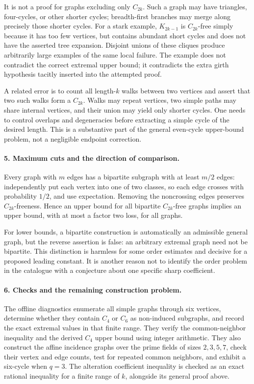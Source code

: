 \documentclass[11pt]{article}
\begin{document}
It is not a proof for graphs excluding only $C_{2k}$. Such a graph may have triangles, four-cycles, or other shorter cycles; breadth-first branches may merge along precisely those shorter cycles. For a stark example, $K_{2k-1}$ is $C_{2k}$-free simply because it has too few vertices, but contains abundant short cycles and does not have the asserted tree expansion. Disjoint unions of these cliques produce arbitrarily large examples of the same local failure. The example does not contradict the correct extremal upper bound; it contradicts the extra girth hypothesis tacitly inserted into the attempted proof.

A related error is to count all length-$k$ walks between two vertices and assert that two such walks form a $C_{2k}$. Walks may repeat vertices, two simple paths may share internal vertices, and their union may yield only shorter cycles. One needs to control overlaps and degeneracies before extracting a simple cycle of the desired length. This is a substantive part of the general even-cycle upper-bound problem, not a negligible endpoint correction.

\paragraph{5. Maximum cuts and the direction of comparison.}
Every graph with $m$ edges has a bipartite subgraph with at least $m/2$ edges: independently put each vertex into one of two classes, so each edge crosses with probability $1/2$, and use expectation. Removing the noncrossing edges preserves $C_{2k}$-freeness. Hence an upper bound for all bipartite $C_{2k}$-free graphs implies an upper bound, with at most a factor two loss, for all graphs.

For lower bounds, a bipartite construction is automatically an admissible general graph, but the reverse assertion is false: an arbitrary extremal graph need not be bipartite. This distinction is harmless for some order estimates and decisive for a proposed leading constant. It is another reason not to identify the order problem in the catalogue with a conjecture about one specific sharp coefficient.

\paragraph{6. Checks and the remaining construction problem.}
The offline diagnostics enumerate all simple graphs through six vertices, determine whether they contain $C_4$ or $C_6$ as non-induced subgraphs, and record the exact extremal values in that finite range. They verify the common-neighbor inequality and the derived $C_4$ upper bound using integer arithmetic. They also construct the affine incidence graphs over the prime fields of sizes $2,3,5,7$, check their vertex and edge counts, test for repeated common neighbors, and exhibit a six-cycle when $q=3$. The alteration coefficient inequality is checked as an exact rational inequality for a finite range of $k$, alongside its general proof above.
\end{document}
